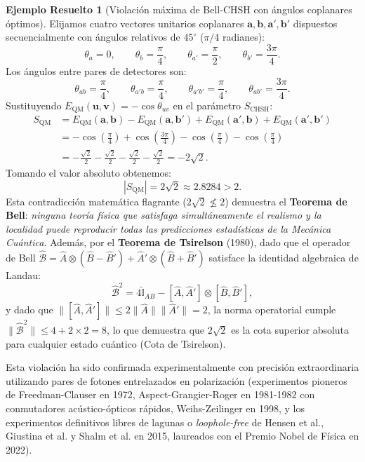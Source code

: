 \documentclass[11pt,a4paper,twoside]{report}
\theoremstyle{definition}
\newtheorem{ejemplo}{Ejemplo Resuelto}[chapter]
\theoremstyle{plain}
\theoremstyle{remark}
\newcommand{\comm}[2]{\left[ #1, #2 \right]}
\newcommand{\op}[1]{\hat{#1}}
\newcommand{\ident}{\hat{\mathbb{I}}}
\begin{document}
\begin{ejemplo}[Violación máxima de Bell-CHSH con ángulos coplanares óptimos]
Elijamos cuatro vectores unitarios coplanares $\bm{a}, \bm{b}, \bm{a}', \bm{b}'$ dispuestos secuencialmente con ángulos relativos de $45^\circ$ ($\pi/4$ radianes):
\begin{equation}
    \theta_{a} = 0, \qquad \theta_{b} = \frac{\pi}{4}, \qquad \theta_{a'} = \frac{\pi}{2}, \qquad \theta_{b'} = \frac{3\pi}{4}.
\end{equation}
Los ángulos entre pares de detectores son:
\begin{equation}
    \theta_{ab} = \frac{\pi}{4}, \qquad \theta_{a'b} = \frac{\pi}{4}, \qquad \theta_{a'b'} = \frac{\pi}{4}, \qquad \theta_{ab'} = \frac{3\pi}{4}.
\end{equation}
Sustituyendo $E_{\text{QM}}(\bm{u}, \bm{v}) = -\cos\theta_{uv}$ en el parámetro $S_{\text{CHSH}}$:
\begin{align}
    S_{\text{QM}} &= E_{\text{QM}}(\bm{a}, \bm{b}) - E_{\text{QM}}(\bm{a}, \bm{b}') + E_{\text{QM}}(\bm{a}', \bm{b}) + E_{\text{QM}}(\bm{a}', \bm{b}') \nonumber \\
    &= -\cos\left(\frac{\pi}{4}\right) + \cos\left(\frac{3\pi}{4}\right) - \cos\left(\frac{\pi}{4}\right) - \cos\left(\frac{\pi}{4}\right) \nonumber \\
    &= -\frac{\sqrt{2}}{2} - \frac{\sqrt{2}}{2} - \frac{\sqrt{2}}{2} - \frac{\sqrt{2}}{2} = -2\sqrt{2}.
\end{align}
Tomando el valor absoluto obtenemos:
\begin{equation}
    |S_{\text{QM}}| = 2\sqrt{2} \approx 2.8284 > 2.
\end{equation}
Esta contradicción matemática flagrante ($2\sqrt{2} \not\le 2$) demuestra el \textbf{Teorema de Bell}: \emph{ninguna teoría física que satisfaga simultáneamente el realismo y la localidad puede reproducir todas las predicciones estadísticas de la Mecánica Cuántica}. Además, por el \textbf{Teorema de Tsirelson} (1980), dado que el operador de Bell $\op{\mathcal{B}} = \op{A}\otimes(\op{B}-\op{B}') + \op{A}'\otimes(\op{B}+\op{B}')$ satisface la identidad algebraica de Landau:
\begin{equation}
    \op{\mathcal{B}}^2 = 4\ident_{AB} - \comm{\op{A}}{\op{A}'} \otimes \comm{\op{B}}{\op{B}'},
\end{equation}
y dado que $\|\comm{\op{A}}{\op{A}'}\| \le 2\|\op{A}\|\|\op{A}'\| = 2$, la norma operatorial cumple $\|\op{\mathcal{B}}^2\| \le 4 + 2\times 2 = 8$, lo que demuestra que $2\sqrt{2}$ es la cota superior absoluta para cualquier estado cuántico (Cota de Tsirelson).

Esta violación ha sido confirmada experimentalmente con precisión extraordinaria utilizando pares de fotones entrelazados en polarización (experimentos pioneros de Freedman-Clauser en 1972, Aspect-Grangier-Roger en 1981-1982 con conmutadores acústico-ópticos rápidos, Weihs-Zeilinger en 1998, y los experimentos definitivos libres de lagunas o \textit{loophole-free} de Hensen et al., Giustina et al. y Shalm et al. en 2015, laureados con el Premio Nobel de Física en 2022).
\end{ejemplo}
\end{document}
